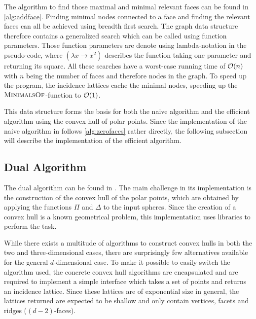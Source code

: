 The algorithm to find those maximal and minimal relevant faces can be found in \cref{alg:addface}.
Finding minimal nodes connected to a face and finding the relevant faces can all be achieved using breadth first search.
The graph data structure therefore contains a generalized search which can be called using function parameters.
Those function parameters are denote using lambda-notation in the pseudo-code, where $(\lambda x \to x^2)$ describes the function taking one parameter and returning its square.
All these searches have a worst-case running time of $\mathcal{O}(n)$ with $n$ being the number of faces and therefore nodes in the graph.
To speed up the program, the incidence lattices cache the minimal nodes, speeding up the $\textsc{MinimalsOf}$-function to $\mathcal{O}(1)$.

This data structure forms the basis for both the naive algorithm and the efficient algorithm using the convex hull of polar points.
Since the implementation of the naive algorithm in  follows \cref{alg:zerofaces} rather directly, the following subsection will describe the implementation of the efficient algorithm.

\subsection{Dual Algorithm}
\label{sub:impl_dual_algorithm}
The dual algorithm can be found in .
The main challenge in its implementation is the construction of the convex hull of the polar points, which are obtained by applying the functions $\Pi$ and $\Delta$ to the input spheres.
Since the creation of a convex hull is a known geometrical problem, this implementation uses libraries to perform the task.

While there exists a multitude of algorithms to construct convex hulls in both the two and three-dimensional cases, there are surprisingly few alternatives available for the general $d$-dimensional case.
To make it possible to easily switch the algorithm used, the concrete convex hull algorithms are encapsulated and are required to implement a simple interface which takes a set of points and returns an incidence lattice.
Since these lattices are of exponential size in general, the lattices returned are expected to be shallow and only contain vertices, facets and ridges ($(d-2)$-faces).

